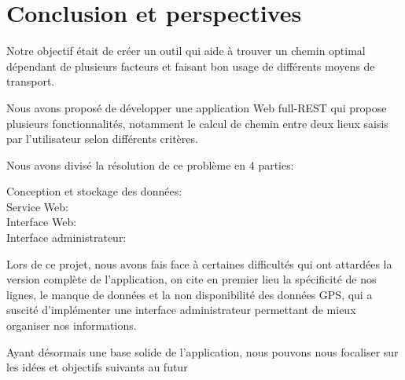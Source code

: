 \chapter{Conclusion et perspectives}

Notre objectif était de créer un outil qui aide à trouver un chemin optimal dépendant de plusieurs facteurs et faisant bon usage de différents moyens de transport. 

Nous avons proposé  de développer une application Web full-REST qui propose plusieurs fonctionnalités, notamment le calcul de chemin entre deux lieux saisis par l'utilisateur selon différents critères.


Nous avons divisé la résolution de ce problème en 4 parties:

\begin{description}
\item[Conception et stockage des données:] 
\item[Service Web:]
\item[Interface Web:]
\item[Interface administrateur:]
\end{description}


Lors de ce projet, nous avons fais face à certaines difficultés qui ont attardées la version complète de l'application, on cite en premier lieu la spécificité de nos lignes, le manque de données et la non disponibilité des données GPS, qui a suscité d'implémenter une interface administrateur permettant de mieux organiser nos informations.


Ayant désormais une base solide de l'application, nous pouvons nous focaliser sur les idées et objectifs suivants au futur 